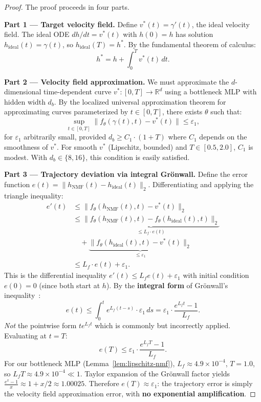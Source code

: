 \documentclass[conference]{IEEEtran}
\newcommand{\RR}{\mathbb{R}}
\begin{document}
\begin{proof}
The proof proceeds in four parts.

\textbf{Part 1 --- Target velocity field.}
Define $v^*(t) = \gamma'(t)$, the ideal velocity field. The ideal ODE $dh/dt = v^*(t)$ with $h(0) = h$ has solution $h_{\text{ideal}}(t) = \gamma(t)$, so $h_{\text{ideal}}(T) = h^*$. By the fundamental theorem of calculus:
\begin{equation}
h^* = h + \int_0^T v^*(t)\,dt.
\end{equation}

\textbf{Part 2 --- Velocity field approximation.}
We must approximate the $d$-dimensional time-dependent curve $v^*: [0,T] \to \RR^d$ using a bottleneck MLP with hidden width $d_b$. By the localized universal approximation theorem for approximating curves parameterized by $t \in [0,T]$, there exists $\theta$ such that:
\begin{equation}
\sup_{t \in [0,T]} \|f_\theta(\gamma(t), t) - v^*(t)\| \leq \varepsilon_1,
\end{equation}
for $\varepsilon_1$ arbitrarily small, provided $d_b \geq C_1 \cdot (1+T)$ where $C_1$ depends on the smoothness of $v^*$. For smooth $v^*$ (Lipschitz, bounded) and $T \in [0.5, 2.0]$, $C_1$ is modest. With $d_b \in \{8, 16\}$, this condition is easily satisfied.

\textbf{Part 3 --- Trajectory deviation via integral Gr\"onwall.}
Define the error function $e(t) = \|h_{\text{NMF}}(t) - h_{\text{ideal}}(t)\|_2$. Differentiating and applying the triangle inequality:
\begin{align}
e'(t) &\leq \|f_\theta(h_{\text{NMF}}(t), t) - v^*(t)\|_2 \nonumber\\
&\leq \underbrace{\|f_\theta(h_{\text{NMF}}(t), t) - f_\theta(h_{\text{ideal}}(t), t)\|_2}_{\leq L_f \cdot e(t)} \nonumber\\
&\quad + \underbrace{\|f_\theta(h_{\text{ideal}}(t), t) - v^*(t)\|_2}_{\leq \varepsilon_1} \nonumber\\
&\leq L_f \cdot e(t) + \varepsilon_1.
\end{align}
This is the differential inequality $e'(t) \leq L_f e(t) + \varepsilon_1$ with initial condition $e(0) = 0$ (since both start at $h$). By the \textbf{integral form} of Gr\"onwall's inequality~\cite{hairer1993solving}:
\begin{equation}
e(t) \leq \int_0^t e^{L_f (t-s)} \cdot \varepsilon_1 \, ds = \varepsilon_1 \cdot \frac{e^{L_f t} - 1}{L_f}.
\end{equation}
\emph{Not} the pointwise form $t e^{L_f t}$ which is commonly but incorrectly applied. Evaluating at $t = T$:
\begin{equation}
e(T) \leq \varepsilon_1 \cdot \frac{e^{L_f T} - 1}{L_f}.
\end{equation}
For our bottleneck MLP (Lemma~\ref{lem:lipschitz-nmf}), $L_f \approx 4.9\times 10^{-4}$, $T=1.0$, so $L_f T \approx 4.9\times 10^{-4} \ll 1$. Taylor expansion of the Gr\"onwall factor yields $\frac{e^{x}-1}{x} \approx 1 + x/2 \approx 1.00025$. Therefore $e(T) \approx \varepsilon_1$: the trajectory error is simply the velocity field approximation error, with \textbf{no exponential amplification}.


\end{proof}
\end{document}
